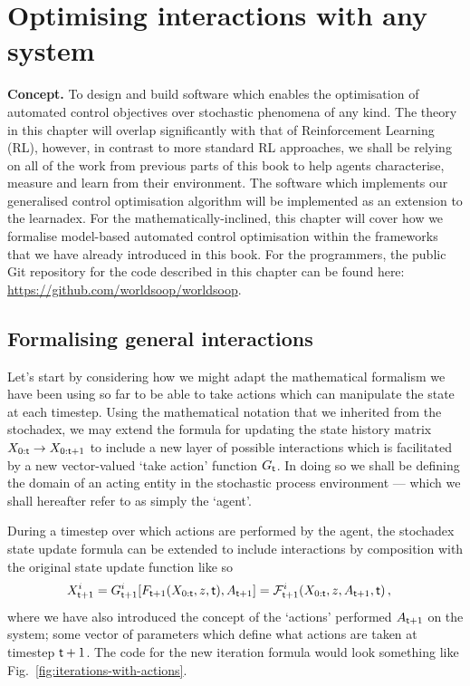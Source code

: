 \chapter{\sffamily Optimising interactions with any system}

{\bfseries\sffamily Concept.} To design and build software which enables the optimisation of automated control objectives over stochastic phenomena of any kind. The theory in this chapter will overlap significantly with that of Reinforcement Learning (RL), however, in contrast to more standard RL approaches, we shall be relying on all of the work from previous parts of this book to help agents characterise, measure and learn from their environment. The software which implements our generalised control optimisation algorithm will be implemented as an extension to the learnadex. For the mathematically-inclined, this chapter will cover how we formalise model-based automated control optimisation within the frameworks that we have already introduced in this book. For the programmers, the public Git repository for the code described in this chapter can be found here: \href{https://github.com/worldsoop/worldsoop}{https://github.com/worldsoop/worldsoop}.

\section{\sffamily Formalising general interactions}

Let's start by considering how we might adapt the mathematical formalism we have been using so far to be able to take actions which can manipulate the state at each timestep. Using the mathematical notation that we inherited from the stochadex, we may extend the formula for updating the state history matrix $X_{0:{\sf t}}\rightarrow X_{0:{\sf t}+1}$ to include a new layer of possible interactions which is facilitated by a new vector-valued `take action' function $G_{{\sf t}}$. In doing so we shall be defining the domain of an acting entity in the stochastic process environment --- which we shall hereafter refer to as simply the `agent'.

During a timestep over which actions are performed by the agent, the stochadex state update formula can be extended to include interactions by composition with the original state update function like so
\begin{align}
X_{{\sf t}+1}^i &= G^i_{{\sf t}+1}[F_{{\sf t}+1}(X_{0:{\sf t}}, z, {\sf t}), A_{{\sf t}+1}] = {\cal F}^i_{{\sf t}+1}(X_{0:{\sf t}}, z, A_{{\sf t}+1}, {\sf t}) \label{eq:generalised-state-actions} \,,
\end{align}
where we have also introduced the concept of the `actions' performed $A_{{\sf t}+1}$ on the system; some vector of parameters which define what actions are taken at timestep ${\sf t}+1$. The code for the new iteration formula would look something like Fig.~\ref{fig:iterations-with-actions}.

